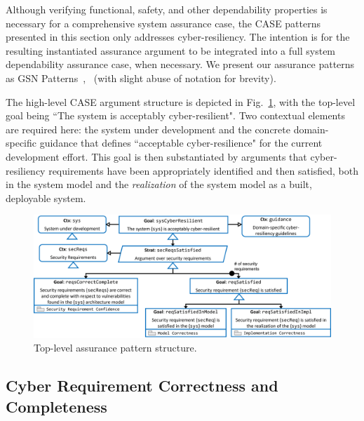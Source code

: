 Although verifying functional, safety, and other dependability properties is necessary for a comprehensive system assurance case, the CASE patterns presented in this section only addresses cyber-resiliency.  The intention is for the resulting instantiated assurance argument to be integrated into a full system dependability assurance case, when necessary.  We present our assurance patterns as GSN Patterns~\cite{Kelly97:patterns},~\cite{GSNv3} (with slight abuse of notation for brevity).


The high-level CASE argument structure is depicted in Fig.~\ref{fig:top-level},
with the top-level goal being ``The system is acceptably cyber-resilient".  
Two contextual elements are required here: the system under development and the concrete domain-specific guidance that defines ``acceptable cyber-resilience" for the current development effort. This goal is then substantiated by arguments that cyber-resiliency requirements have been appropriately identified and then satisfied, both in the system model and the \textit{realization} of the system model as a built, deployable system.

\begin{figure}[h] 
	\centering 
	\includegraphics[width=\textwidth]{figs/top-level.png}
	\caption{Top-level assurance pattern structure.}
	\label{fig:top-level} 
\end{figure}

\subsection{Cyber Requirement Correctness and Completeness}


